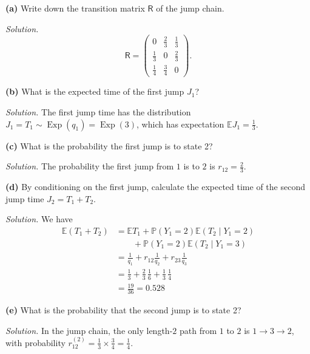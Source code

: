 \documentclass[
  a4paper,
]{article}
\theoremstyle{definition}
\theoremstyle{definition}
\theoremstyle{definition}
\theoremstyle{remark}
\begin{document}
\textbf{(a)} Write down the transition matrix \(\mathsf R\) of the jump chain.

\begin{myanswers}
\emph{Solution.}
\[ \mathsf R = \begin{pmatrix} 0 & \frac23 & \frac13 \\[0.5ex] \frac13 & 0 & \frac23 \\[0.5ex] \frac14 & \frac34 & 0 \end{pmatrix} . \]

\end{myanswers}

\textbf{(b)} What is the expected time of the first jump \(J_1\)?

\begin{myanswers}
\emph{Solution.}
The first jump time has the distribution \(J_1 = T_1 \sim \operatorname{Exp}(q_1) = \operatorname{Exp}(3)\), which has expectation \(\mathbb E J_1 = \frac13\).

\end{myanswers}

\textbf{(c)} What is the probability the first jump is to state 2?

\begin{myanswers}
\emph{Solution.}
The probability the first jump from \(1\) is to \(2\) is \(r_{12} = \frac23\).

\end{myanswers}

\textbf{(d)} By conditioning on the first jump, calculate the expected time of the second jump time \(J_2 = T_1 + T_2\).

\begin{myanswers}
\emph{Solution.}
We have
\begin{align*}
\mathbb E(T_1 + T_2) &= \mathbb ET_1 + \mathbb P(Y_1 = 2) \mathbb E(T_2 \mid Y_1 = 2) \\ &\qquad{}+ \mathbb P(Y_1 = 2) \mathbb E(T_2 \mid Y_1 = 3) \\&= \frac1{q_1} + r_{12} \frac{1}{q_2} + r_{23} \frac{1}{q_3} \\&= \tfrac13 + \tfrac23 \, \tfrac16 + \tfrac13 \, \tfrac14 \\ &= \tfrac{19}{36} = 0.528
\end{align*}

\end{myanswers}

\textbf{(e)} What is the probability that the second jump is to state 2?

\begin{myanswers}
\emph{Solution.}
In the jump chain, the only length-\(2\) path from \(1\) to \(2\) is \(1 \to 3 \to 2\), with probability \(r_{12}^{(2)}=\frac13 \times \frac34 = \frac14\).

\end{myanswers}
\end{document}
